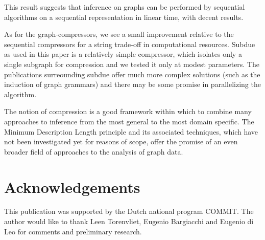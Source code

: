 \documentclass[10pt,a4paper,oneside]{article}
\begin{document}
This result suggests that inference on graphs can be performed by sequential algorithms on a sequential representation in linear time, with decent results. 

As for the graph-compressors, we see a small improvement relative to the sequential compressors for a string trade-off in computational resources. Subdue as used in this paper is a relatively simple compressor, which isolates only a single subgraph for compression and we tested it only at modest parameters. The publications surreounding subdue offer much more complex solutions (such as the induction of graph grammars) and there may be some promise in parallelizing the algorithm.

The notion of compression is a good framework within which to combine many approaches to inference from the most general to the most domain specific. The Minimum Description Length principle and its associated techniques, which have not been investigated yet for reasons of scope, offer the promise of an even broader field of approaches to the analysis of graph data.
  
\section*{Acknowledgements}

This publication was supported by the Dutch national program COMMIT. The author would like to thank Leen Torenvliet, Eugenio Bargiacchi and Eugenio di Leo for comments and preliminary research.
\end{document}
